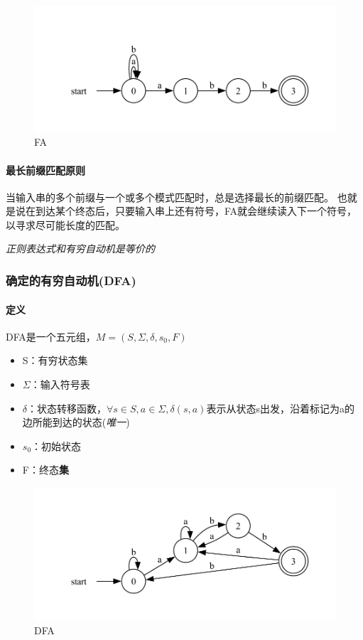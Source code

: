 \documentclass[UTF8]{ctexart} %
\begin{document}
\begin{figure}[H]
    \centering
    \includegraphics[width=\textwidth]{assets/FA.pdf}
    \caption{FA}
\end{figure}

\paragraph{最长前缀匹配原则} 当输入串的多个前缀与一个或多个模式匹配时，总是选择最长的前缀匹配。
也就是说在到达某个终态后，只要输入串上还有符号，FA就会继续读入下一个符号，以寻求尽可能长度的匹配。

\emph{正则表达式和有穷自动机是等价的}

\subsubsection{确定的有穷自动机(DFA)}

\paragraph{定义} DFA是一个五元组，$M=(S,\Sigma,\delta,s_0,F)$

\begin{itemize}
    \item S：有穷状态集
    \item $\Sigma$：输入符号表
    \item $\delta$：状态转移函数，$\forall s\in S,a\in \Sigma,\delta(s,a)$表示从状态s出发，沿着标记为a的边所能到达的状态(\emph{唯一})
    \item $s_0$：初始状态
    \item F：终态\textbf{集}
\end{itemize}

\begin{figure}[H]
    \centering
    \includegraphics[width=\textwidth]{assets/DFA.pdf}
    \caption{DFA}
\end{figure}
\end{document}
